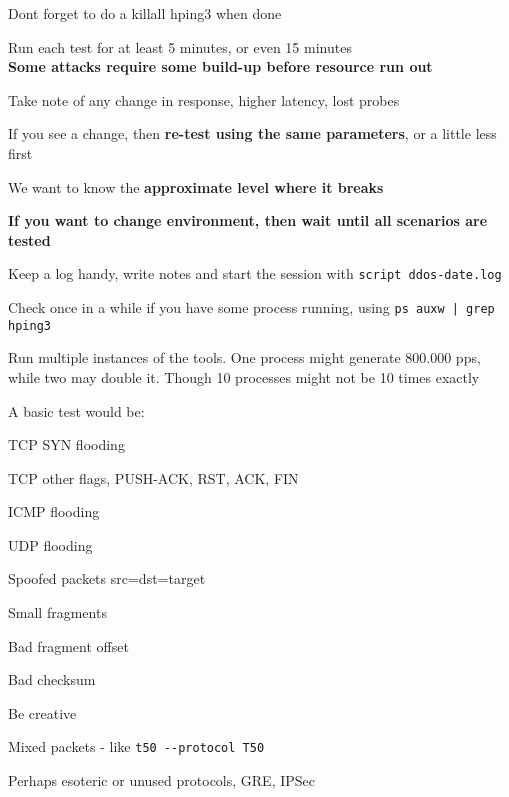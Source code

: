 \documentclass[Screen16to9,17pt]{foils}
\begin{document}
\vskip 1cm
\centerline{Dont forget to do a killall hping3 when done \smiley }




\begin{list2}
\item Run each test for at least 5 minutes, or even 15 minutes\\
{\bf Some attacks require some build-up before resource run out}
\item Take note of any change in response, higher latency, lost probes
\item If you see a change, then {\bf re-test using the same parameters}, or a little less first
\item We want to know the {\bf approximate level where it breaks}
\item {\bf If you want to change environment, then wait until all scenarios are tested}
\item Keep a log handy, write notes and start the session with \verb+script ddos-date.log+
\item Check once in a while if you have some process running, using \verb+ps auxw | grep hping3+
\item Run multiple instances of the tools. One process might generate 800.000 pps, while two may double it. Though 10 processes might not be 10 times exactly
\end{list2}




A basic test would be:
\begin{list2}
\item TCP SYN flooding
\item TCP other flags, PUSH-ACK, RST, ACK, FIN
\item ICMP flooding
\item UDP flooding
\item Spoofed packets src=dst=target \smiley
\item Small fragments
\item Bad fragment offset
\item Bad checksum
\item Be creative
\item Mixed packets - like \verb+t50 --protocol T50+
\item Perhaps esoteric or unused protocols, GRE, IPSec
\end{list2}
\end{document}
